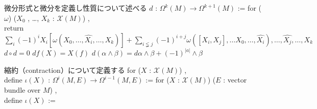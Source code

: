 \begin{Proof}
\itemprof
  \WIP
\itemprof
  \WIP
\end{Proof}

\begin{Definition}
\itemnote
  微分形式と微分を定義し性質について述べる
\itemdefi
  \(d\) : \(\Omega^{k}(M) \to \Omega^{k + 1}(M)\) :=
  for (\(\omega\)) (\(X_0\) , \ldots , \(X_k\) : \(\mathcal{X}(M)\)) ,\\
  return \(\sum_i (-1)^i X_i[\omega(X_0 , \ldots , \hat{X_i} , \ldots , X_k)] + \sum_{i \lneqq j} (-1)^{i + j} \omega([X_i , X_j] , \ldots X_0 , \ldots , \hat{X_i}) , \ldots , \hat{X_j} , \ldots , X_k\)
\itemprop
  \(d \circ d = 0\)
\itemprop
  \(df (X) = X(f)\)
\itemprop
  \(d (\alpha \wedge \beta) = d \alpha \wedge \beta + (-1)^{|a|} \wedge \beta\)
\end{Definition}

\begin{Definition}
\itemnote
  縮約（contraction）について定義する
\itemdefi
  for (\(X\) : \(\mathcal{X}(M)\)) ,\\
  define \(\iota(X)\) : \(\Omega^i(M , E) \to \Omega^{i - 1}(M ,E)\) := 
\itemdefi
  for (\(X\) : \(\mathcal{X}(M)\)) (\(E\) : vector bundle over \(M\)) ,\\
  define \(\iota(X)\) := 
\end{Definition}